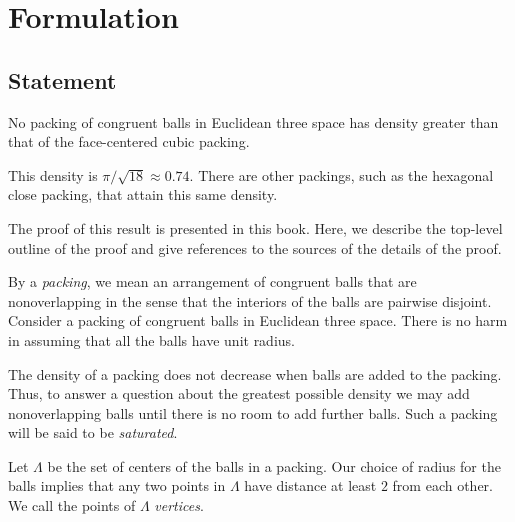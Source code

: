 
\def\lam{\lambda}
\def\Lam{\Lambda}
\def\bl{{\underline{\lam}}}
\def\bm{{\underline{\mu}}}
\def\angle#1#2#3{{\op{angle}(#1,{#2,#3})}}

\chapter{Formulation}

\section{Statement}



\begin{theorem}
\label{theorem:kepler}   No packing of congruent balls in
Euclidean three space has density greater than that of the
face-centered cubic packing.
\end{theorem}

\begin{remark}
This density is $\pi/\sqrt{18}\approx 0.74.$  There are other
packings, such as the hexagonal close packing, that attain this
same density.
\end{remark}

The proof of this result is presented in this book. Here, we
describe the top-level outline of the proof and give references to
the sources of the details of the proof.

By a {\it packing}, we mean an arrangement of congruent balls that
are nonoverlapping in the sense that the interiors of the balls are
pairwise disjoint. Consider a  packing of congruent
balls in Euclidean three space. There is no harm in assuming that
all the balls have unit radius. 

The density of a packing does not
decrease when balls are added to the packing. Thus, to answer a
question about the greatest possible density we may add
nonoverlapping balls until there is no room to add further balls.
Such a packing will be said to be {\it saturated}.


Let $\Lambda$ be the set of centers of the balls in a
packing. Our choice of radius for the
balls implies that any two points in $\Lambda$ have distance at
least $2$ from each other. We call the points of $\Lambda$ {\it
{} vertices}.

